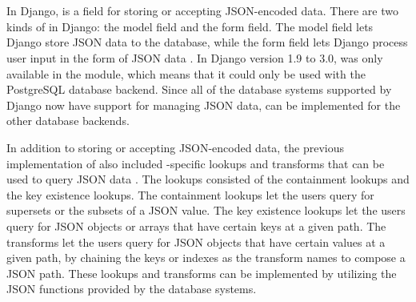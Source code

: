 \section{}

In Django,  is a field for storing or accepting JSON-encoded
data. There are two kinds of  in Django: the model field and
the form field. The model field lets Django store JSON data to the database,
while the form field lets Django process user input in the form of JSON data
\cite{django30_modeljsonfield} \cite{django30_formjsonfield}. In Django version
1.9 to 3.0,  was only available in the
 module, which means that it could only be used
with the PostgreSQL database backend. Since all of the database systems
supported by Django now have support for managing JSON data, 
can be implemented for the other database backends.

In addition to storing or accepting JSON-encoded data, the previous
implementation of  also included -specific
lookups and transforms that can be used to query JSON data
\cite{django30_modeljsonfield}. The lookups consisted of the containment
lookups and the key existence lookups. The containment lookups let the users
query for supersets or the subsets of a JSON value. The key existence lookups
let the users query for JSON objects or arrays that have certain keys at a
given path. The transforms let the users query for JSON objects that have
certain values at a given path, by chaining the keys or indexes as the
transform names to compose a JSON path. These lookups and transforms can be
implemented by utilizing the JSON functions provided by the database systems.
